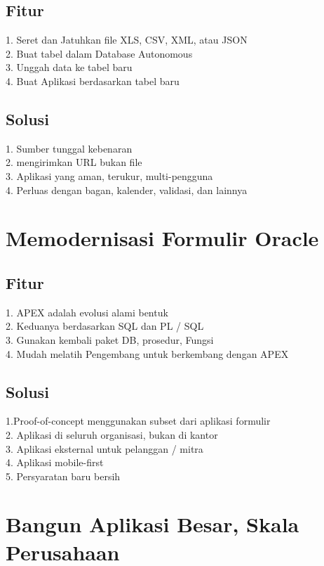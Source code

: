 \documentclass [12pt, times new roman, a4paper]{article}
\begin{document}
\subsection{Fitur}
1. Seret dan Jatuhkan file XLS, CSV, XML, atau JSON\\
2. Buat tabel dalam Database Autonomous\\
3. Unggah data ke tabel baru\\
4. Buat Aplikasi berdasarkan tabel baru\\

\subsection{Solusi}
1. Sumber tunggal kebenaran\\
2. mengirimkan URL bukan file\\
3. Aplikasi yang aman, terukur, multi-pengguna\\
4. Perluas dengan bagan, kalender, validasi, dan lainnya\\
\section{Memodernisasi Formulir Oracle}
\subsection{Fitur}
1. APEX adalah evolusi alami bentuk\\
2. Keduanya berdasarkan SQL dan PL / SQL\\
3. Gunakan kembali paket DB, prosedur, Fungsi\\
4. Mudah melatih Pengembang untuk berkembang dengan APEX\\
 
\subsection{Solusi}
1.Proof-of-concept menggunakan subset dari aplikasi formulir\\
2. Aplikasi di seluruh organisasi, bukan di kantor\\
3. Aplikasi eksternal untuk pelanggan / mitra\\
4. Aplikasi mobile-first\\
5. Persyaratan baru bersih\\
\section{Bangun Aplikasi Besar, Skala Perusahaan}
\end{document}
